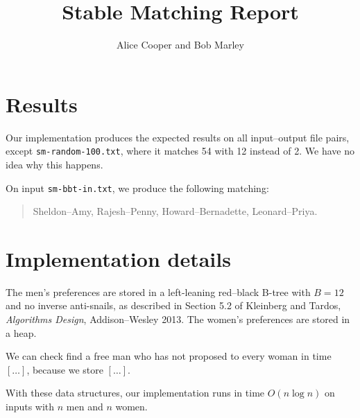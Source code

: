 \documentclass{tufte-handout}
\title{Stable Matching Report}
\author{Alice Cooper and Bob Marley}
\begin{document}
  \maketitle

  \section{Results}

  Our implementation produces the expected results on all input--output file pairs, except {\tt sm-random-100.txt}, where it matches 54 with 12 instead of 2.
  We have no idea why this happens.%

  On input {\tt sm-bbt-in.txt}, we produce the following matching:
  \begin{quotation}
    Sheldon--Amy, Rajesh--Penny, Howard--Bernadette, Leonard--Priya.  
  \end{quotation}

  \section{Implementation details}

  The men's preferences are stored in a left-leaning red--black B-tree with $B=12$ and no inverse anti-snails,%
   as described in Section 5.2 of Kleinberg and Tardos, \emph{Algorithms Design}, Addison--Wesley 2013.%
  The women's preferences are stored in a heap.

  We can check find a free man who has not proposed to every woman in time $[\ldots]$,
  because we store $[\ldots]$.

  With these data structures, our implementation runs in time $O(n\log n)$  
  on inputs with $n$ men and $n$ women.
\end{document}
